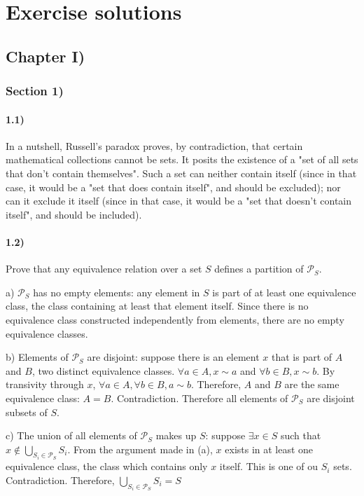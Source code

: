 \documentclass[12pt, letterpaper, twoside]{report}
\begin{document}
\author{Multiversity \textit{Algebra Chapter 0} Reading Group}
\part{Exercise solutions}
\chapter*{Chapter I)}

\section*{Section 1)}

\subsection*{1.1)}

In a nutshell, Russell's paradox proves, by contradiction, that certain mathematical collections cannot be sets. It posits the existence of a "set of all sets that don't contain themselves". Such a set can neither contain itself (since in that case, it would be a "set that does contain itself", and should be excluded); nor can it exclude it itself (since in that case, it would be a "set that doesn't contain itself", and should be included).



\subsection*{1.2)}

Prove that any equivalence relation over a set $S$ defines a partition of $\mathcal{P}_S$.

a) $\mathcal{P}_S$ has no empty elements: any element in $S$ is part of at least one equivalence class, the class containing at least that element itself. Since there is no equivalence class constructed independently from elements, there are no empty equivalence classes.

b) Elements of $\mathcal{P}_S$ are disjoint: suppose there is an element $x$ that is part of $A$ and $B$, two distinct equivalence classes. $\forall a \in A, x \sim a$ and $\forall b \in B, x \sim b$. By transivity through $x$, $\forall a \in A, \forall b \in B, a \sim b$. Therefore, $A$ and $B$ are the same equivalence class: $A = B$. Contradiction. Therefore all elements of $\mathcal{P}_S$ are disjoint subsets of $S$.

c) The union of all elements of $\mathcal{P}_S$ makes up $S$: suppose $\exists x \in S$ such that $x \notin \bigcup_{S_i \in \mathcal{P}_S} S_i$. From the argument made in (a), $x$ exists in at least one equivalence class, the class which contains only $x$ itself. This is one of ou $S_i$ sets. Contradiction. Therefore, $\bigcup_{S_i \in \mathcal{P}_S} S_i = S$
\end{document}
